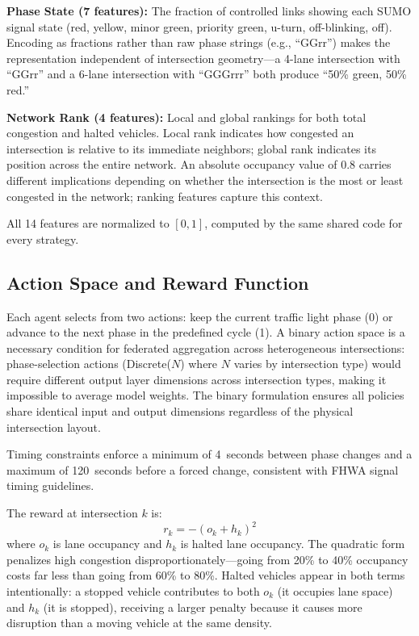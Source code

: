\documentclass[conference]{IEEEtran}
\begin{document}
\textbf{Phase State (7 features):} The fraction of controlled links showing each SUMO signal state (red, yellow, minor green, priority green, u-turn, off-blinking, off). Encoding as fractions rather than raw phase strings (e.g., ``GGrr'') makes the representation independent of intersection geometry---a 4-lane intersection with ``GGrr'' and a 6-lane intersection with ``GGGrrr'' both produce ``50\% green, 50\% red.''

\textbf{Network Rank (4 features):} Local and global rankings for both total congestion and halted vehicles. Local rank indicates how congested an intersection is relative to its immediate neighbors; global rank indicates its position across the entire network. An absolute occupancy value of 0.8 carries different implications depending on whether the intersection is the most or least congested in the network; ranking features capture this context.

All 14 features are normalized to $[0, 1]$, computed by the same shared code for every strategy.

\subsection{Action Space and Reward Function}

Each agent selects from two actions: keep the current traffic light phase (0) or advance to the next phase in the predefined cycle (1). A binary action space is a necessary condition for federated aggregation across heterogeneous intersections: phase-selection actions (Discrete($N$) where $N$ varies by intersection type) would require different output layer dimensions across intersection types, making it impossible to average model weights. The binary formulation ensures all policies share identical input and output dimensions regardless of the physical intersection layout.

Timing constraints enforce a minimum of 4~seconds between phase changes and a maximum of 120~seconds before a forced change, consistent with FHWA signal timing guidelines.

The reward at intersection $k$ is:
\begin{equation}
    r_k = -(o_k + h_k)^2
    \label{eq:reward}
\end{equation}
where $o_k$ is lane occupancy and $h_k$ is halted lane occupancy. The quadratic form penalizes high congestion disproportionately---going from 20\% to 40\% occupancy costs far less than going from 60\% to 80\%. Halted vehicles appear in both terms intentionally: a stopped vehicle contributes to both $o_k$ (it occupies lane space) and $h_k$ (it is stopped), receiving a larger penalty because it causes more disruption than a moving vehicle at the same density.
\end{document}
